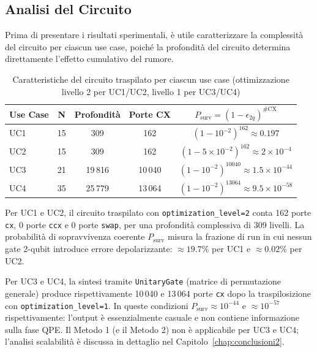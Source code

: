 \begin{onehalfspace}
\section{Analisi del Circuito}
\label{sec:circuito_m1}

Prima di presentare i risultati sperimentali, è utile caratterizzare la complessità del circuito per ciascun use case, poiché la profondità del circuito determina direttamente l'effetto cumulativo del rumore.

\begin{table}[H]
\centering
\caption{Caratteristiche del circuito traspilato per ciascun use case (ottimizzazione livello 2 per UC1/UC2, livello 1 per UC3/UC4)}
\label{tab:circuit_depth}
\begin{tabular}{lcccc}
\hline
\textbf{Use Case} & \textbf{N} & \textbf{Profondità} & \textbf{Porte CX} & \textbf{$P_{\text{surv}} = (1-\epsilon_{2q})^{\#\text{CX}}$} \\
\hline
UC1 & 15 & 309    & 162    & $(1-10^{-2})^{162} \approx 0.197$ \\
UC2 & 15 & 309    & 162    & $(1-5\times10^{-2})^{162} \approx 2\times10^{-4}$ \\
UC3 & 21 & 19\,816 & 10\,040 & $(1-10^{-2})^{10040} \approx 1.5\times10^{-44}$ \\
UC4 & 35 & 25\,779 & 13\,064 & $(1-10^{-2})^{13064} \approx 9.5\times10^{-58}$ \\
\hline
\end{tabular}
\end{table}

Per UC1 e UC2, il circuito traspilato con \texttt{optimization\_level=2} conta 162 porte \texttt{cx}, 0 porte \texttt{ccx} e 0 porte \texttt{swap}, per una profondità complessiva di 309 livelli. La probabilità di sopravvivenza coerente $P_{\text{surv}}$ misura la frazione di run in cui nessun gate 2-qubit introduce errore depolarizzante: $\approx 19.7\%$ per UC1 e $\approx 0.02\%$ per UC2.

Per UC3 e UC4, la sintesi tramite \texttt{UnitaryGate} (matrice di permutazione generale) produce rispettivamente 10\,040 e 13\,064 porte \texttt{cx} dopo la traspilosizione con \texttt{optimization\_level=1}. In queste condizioni $P_{\text{surv}} \approx 10^{-44}$ e $\approx 10^{-57}$ rispettivamente: l'output è essenzialmente casuale e non contiene informazione sulla fase QPE. Il Metodo 1 (e il Metodo 2) non è applicabile per UC3 e UC4; l'analisi scalabilità è discussa in dettaglio nel Capitolo~\ref{chap:conclusioni2}.


\end{onehalfspace}
